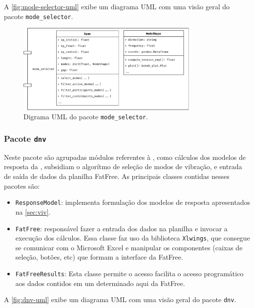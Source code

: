 A \autoref{fig:mode-selector-uml} exibe um diagrama UML com uma visão geral do pacote \texttt{mode\_selector}.

\begin{figure}[!ht]
    \centering
    \caption{Digrama UML do pacote \texttt{mode\_selector}.}\label{fig:mode-selector-uml}
    \includegraphics[width=0.8\textwidth]{imagens/mode-selector-uml}
\end{figure}


\subsubsection{Pacote \texttt{dnv}}

Neste pacote são agrupadas módulos referentes à , como cálculos dos modelos de resposta da , subsidiam o algorítmo de seleção de modos de vibração, e entrada de saída de dados da planilha FatFree. As principais classes contidas nesses pacotes são:

\begin{itemize}
    \item \texttt{ResponseModel}: implementa formulação dos modelos de resposta apresentados na \autoref{sec:viv}.

    \item \texttt{FatFree}: responsável fazer a entrada dos dados na planilha e invocar a execução dos cálculos. Essa classe faz uso da biblioteca \texttt{Xlwings}, que consegue se comunicar com o Microsoft Excel e manipular os componentes (caixas de seleção, botões, etc) que formam a interface da FatFree.

    \item \texttt{FatFreeResults}: Esta classe permite o acesso facilita o acesso programático aos dados contidos em um determinado aqui da FatFree.
\end{itemize}

A \autoref{fig:dnv-uml} exibe um diagrama UML com uma visão geral do pacote \texttt{dnv}.

